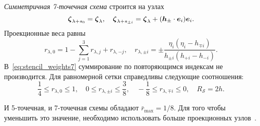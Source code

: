 \emph{Симметричная 7-точечная схема} строится на узлах
\begin{equation}\label{eq:stencil_nodes7}
    {\boldsymbol{\zeta}}_{\lambda+s_0} = {\boldsymbol{\zeta}}_{\lambda}, \quad
    {\boldsymbol{\zeta}}_{\lambda+s_{\pm i}} = {\boldsymbol{\zeta}}_{\lambda} + ({\boldsymbol{h}}_\pm\cdot \boldsymbol{e}_i)\boldsymbol{e}_i.
\end{equation}
Проекционные веса равны
\begin{equation}\label{eq:stencil_weights7}
    r_{\lambda,0} = 1 - \sum_{j=1}^3 r_{\lambda,j} + r_{\lambda,-j}, \quad
    r_{\lambda,\pm i} = \pm\frac{\eta_i(\eta_i - h_{\mp i})}{h_{\pm i}(h_{+i}-h_{-i})}.
\end{equation}
В~\eqref{eq:stencil_weights7} суммирование по повторяющимся индексам не производится.
Для равномерной сетки справедливы следующие соотношения:
\begin{equation}\label{eq:weights_ranges7}
    \frac14 \leq r_{\lambda,0} \leq 1, \quad
    0 \leq r_{\lambda,\pm i} \leq \frac38, \quad
    -\frac18 \leq r_{\lambda,\mp i} \leq 0, \quad
    R_\mathcal{S} = 2h.
\end{equation}

И 5-точечная, и 7-точечная схемы обладают \(\bar{r}_{\max}=1/8\).
Для того чтобы уменьшить это значение, необходимо использовать больше проекционных узлов~\cite{Dodulad2012}.


\clearpage
